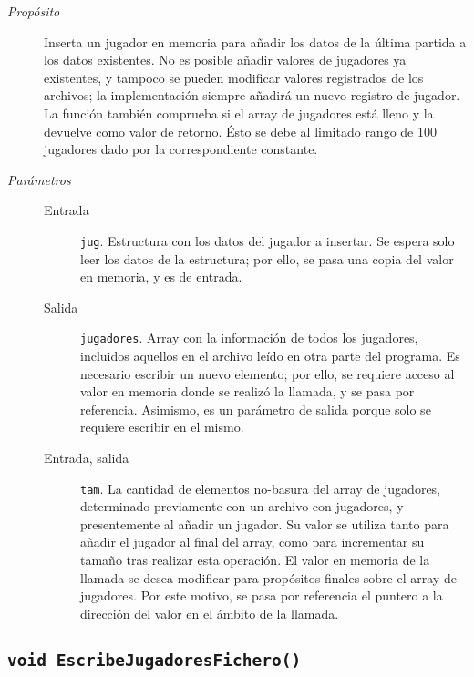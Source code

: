 \documentclass[12pt]{article}
\begin{document}
\begin{description}

\item[\emph{Propósito}]

Inserta un jugador en memoria para añadir los datos de la última partida a los
datos existentes. No es posible añadir valores de jugadores ya existentes, y
tampoco se pueden modificar valores registrados de los archivos; la
implementación siempre añadirá un nuevo registro de jugador. La función también
comprueba si el array de jugadores está lleno y la devuelve como valor de
retorno. Ésto se debe al limitado rango de 100 jugadores dado por la
correspondiente constante.

\item[\emph{Parámetros}] \leavevmode

\begin{description}

\item[Entrada] \texttt{jug}. Estructura con los datos del jugador a
insertar. Se espera solo leer los datos de la estructura; por ello, se pasa una
copia del valor en memoria, y es de entrada.

\item[Salida] \texttt{jugadores}. Array con la información de todos los
jugadores, incluidos aquellos en el archivo leído en otra parte del programa. Es
necesario escribir un nuevo elemento; por ello, se requiere acceso al valor en
memoria donde se realizó la llamada, y se pasa por referencia. Asimismo, es un
parámetro de salida porque solo se requiere escribir en el mismo.

\item[Entrada, salida] \texttt{tam}. La cantidad de elementos no-basura
del array de jugadores, determinado previamente con un archivo con jugadores, y
presentemente al añadir un jugador. Su valor se utiliza tanto para añadir el
jugador al final del array, como para incrementar su tamaño tras realizar esta
operación. El valor en memoria de la llamada se desea modificar para propósitos
finales sobre el array de jugadores. Por este motivo, se pasa por referencia el
puntero a la dirección del valor en el ámbito de la llamada.

\end{description}

\end{description}

\subsection*{\texttt{void EscribeJugadoresFichero()}}
\end{document}
